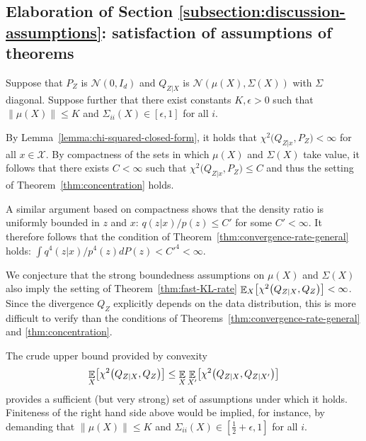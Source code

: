 \subsection{Elaboration of Section \ref{subsection:discussion-assumptions}: satisfaction of assumptions of theorems}\label{appendix:discussion-constraints}

Suppose that ${P_Z}$ is  ${\mathcal{N}\left(0, I_d\right)}$ and ${Q_{Z|X}}$ is  ${\mathcal{N}\left( \mu(X), \Sigma(X)\right)}$ with $\Sigma$ diagonal. 
Suppose further that there exist constants $K, \epsilon > 0$ such that ${\| \mu(X)\| \leq K}$ and ${\Sigma_{ii}(X) \in [\epsilon, 1]}$ for all $i$.

By Lemma~\ref{lemma:chi-squared-closed-form}, it holds that $\chi^2\bigl( Q_{Z|x}, P_Z\bigr) < \infty$ for all $x\in\mathcal{X}$. 
By compactness of the sets in which $\mu(X)$ and $\Sigma(X)$ take value, it follows that there exists $C<\infty$ such that $\chi^2\bigl( Q_{Z|x}, P_Z\bigr) \leq C$ and thus the setting of Theorem~\ref{thm:concentration} holds.

A similar argument based on compactness shows that the density ratio is uniformly bounded in $z$ and $x$: $q(z|x)/p(z) \leq C'$ for some $C'<\infty$. 
It therefore follows that the condition of Theorem~\ref{thm:convergence-rate-general} holds: $\int q^4(z|x)/p^4(z) dP(z) < {C'}^4 < \infty$.

We conjecture that the strong boundedness assumptions on $\mu(X)$ and $\Sigma(X)$ also imply the setting of Theorem~\ref{thm:fast-KL-rate} $\mathop{\mathbb{E}}_{X}\bigl[\chi^2\bigl(Q_{Z|X}, Q_Z\bigr)\bigr] < \infty$.
Since the divergence $Q_Z$ explicitly depends on the data distribution, this is more difficult to verify than the conditions of Theorems~\ref{thm:convergence-rate-general} and \ref{thm:concentration}.

The crude upper bound provided by convexity
\[
\mathop{\mathbb{E}}_{X}\bigl[\chi^2\bigl(Q_{Z|X}, Q_Z\bigr)\bigr] \leq  \mathop{\mathbb{E}}_{X}\mathop{\mathbb{E}}_{X'}\bigl[\chi^2\bigl(Q_{Z|X}, Q_{Z|X'}\bigr)\bigr]
\]
provides a sufficient (but very strong) set of assumptions under which it holds. 
Finiteness of the right hand side above would be implied, for instance, by demanding that ${\| \mu(X)\| \leq K}$ and ${\Sigma_{ii}(X) \in [\frac{1}{2}+\epsilon, 1]}$ for all $i$.
